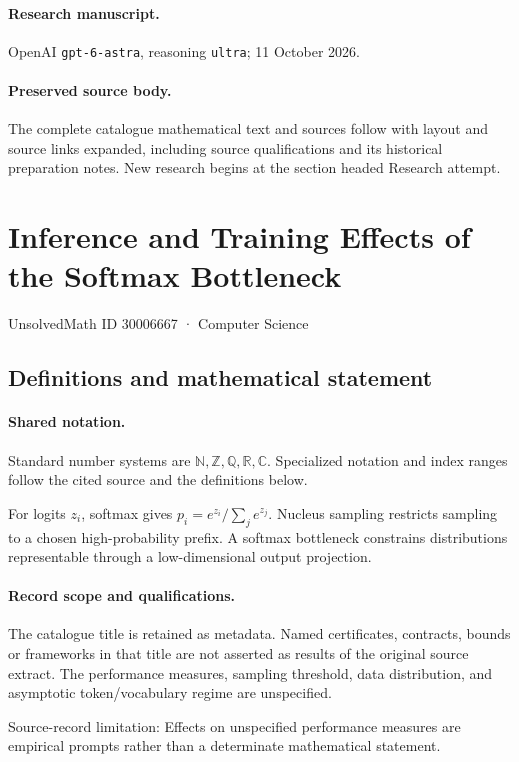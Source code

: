 \documentclass[11pt]{article}
\begin{document}
\paragraph{Research manuscript.} OpenAI \texttt{gpt-6-astra}, reasoning \texttt{ultra}; 11 October 2026.
\paragraph{Preserved source body.} The complete catalogue mathematical text and sources follow with layout and source links expanded, including source qualifications and its historical preparation notes. New research begins at the section headed Research attempt.

\section{Inference and Training Effects of the Softmax Bottleneck}\label{30006667}
{\small UnsolvedMath ID 30006667 · Computer Science}
\subsection{Definitions and mathematical statement}

\paragraph{Shared notation.}Standard number systems are $\mathbb N,\mathbb Z,\mathbb Q,\mathbb R,\mathbb C$. Specialized notation and index ranges follow the cited source and the definitions below.


For logits $z_i$, softmax gives $p_i=e^{z_i}/\sum_j e^{z_j}$. Nucleus sampling restricts sampling to a chosen high-probability prefix. A softmax bottleneck constrains distributions representable through a low-dimensional output projection.
\paragraph{Record scope and qualifications.}
The catalogue title is retained as metadata. Named certificates, contracts, bounds or frameworks in that title are not asserted as results of the original source extract.
The performance measures, sampling threshold, data distribution, and asymptotic token/vocabulary regime are unspecified.

Source-record limitation: Effects on unspecified performance measures are empirical prompts rather than a determinate mathematical statement.
\end{document}
